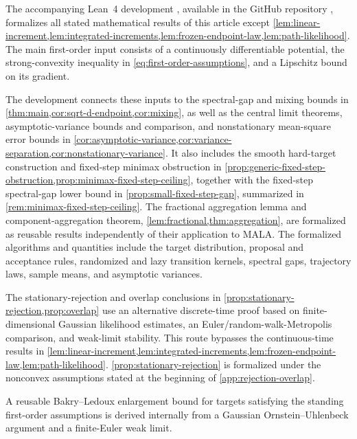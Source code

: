 \documentclass[11pt]{article}
\newcommand{\1}{\mathbf 1}
\begin{document}
	The accompanying Lean~4 development \citep{deMouraUllrich2021},
	available in the GitHub repository \citep{qinMALALean2026}, formalizes
	all stated mathematical results of this article except
	\cref{lem:linear-increment,lem:integrated-increments,lem:frozen-endpoint-law,lem:path-likelihood}.
	The main first-order input consists of a continuously differentiable
	potential, the strong-convexity inequality in
	\eqref{eq:first-order-assumptions}, and a Lipschitz bound on its
	gradient.
	
	
	The development connects these inputs to the spectral-gap and mixing
	bounds in \cref{thm:main,cor:sqrt-d-endpoint,cor:mixing}, as well as the central limit theorems, asymptotic-variance bounds and comparison,
	and nonstationary mean-square error bounds in \cref{cor:asymptotic-variance,cor:variance-separation,cor:nonstationary-variance}. It also includes the smooth
	hard-target construction and fixed-step minimax obstruction in
	\cref{prop:generic-fixed-step-obstruction,prop:minimax-fixed-step-ceiling},
	together with the fixed-step spectral-gap lower bound in
	\cref{prop:small-fixed-step-gap}, summarized in
	\cref{rem:minimax-fixed-step-ceiling}. The fractional aggregation
	lemma and component-aggregation theorem,
	\cref{lem:fractional,thm:aggregation}, are formalized as reusable results
	independently of their application to MALA. The formalized algorithms and
	quantities include the target distribution, proposal and acceptance
	rules, randomized and lazy transition kernels, spectral gaps, trajectory
	laws, sample means, and asymptotic variances.
	
	The stationary-rejection and overlap conclusions in
	\cref{prop:stationary-rejection,prop:overlap} use an alternative
	discrete-time proof based on finite-dimensional Gaussian likelihood
	estimates, an Euler/random-walk-Metropolis comparison, and weak-limit
	stability. This route bypasses the continuous-time results in \cref{lem:linear-increment,lem:integrated-increments,lem:frozen-endpoint-law,lem:path-likelihood}.
	\cref{prop:stationary-rejection} is formalized under the
	nonconvex assumptions stated at the beginning of \cref{app:rejection-overlap}.
	
	A reusable Bakry--Ledoux enlargement bound for targets satisfying
	the standing first-order assumptions is derived internally from a
	Gaussian Ornstein--Uhlenbeck argument and a finite-Euler weak limit.
	
\end{document}
